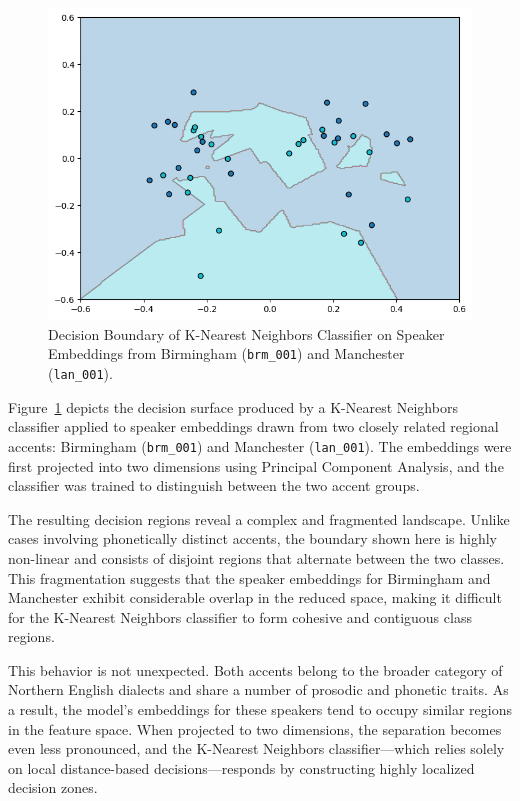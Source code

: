 \documentclass[conference]{IEEEtran}
\begin{document}
\begin{figure}[h]
	\centering
	\includegraphics[width=0.7\linewidth]{img/img-knn-brm-lan.png}
	\caption{Decision Boundary of K-Nearest Neighbors Classifier on Speaker Embeddings from Birmingham (\texttt{brm\_001}) and Manchester (\texttt{lan\_001}).}
	\label{fig:knn-brm-lan}
\end{figure}


Figure~\ref{fig:knn-brm-lan} depicts the decision surface produced by a K-Nearest Neighbors classifier applied to speaker embeddings drawn from two closely related regional accents: Birmingham (\texttt{brm\_001}) and Manchester (\texttt{lan\_001}). The embeddings were first projected into two dimensions using Principal Component Analysis, and the classifier was trained to distinguish between the two accent groups.

The resulting decision regions reveal a complex and fragmented landscape. Unlike cases involving phonetically distinct accents, the boundary shown here is highly non-linear and consists of disjoint regions that alternate between the two classes. This fragmentation suggests that the speaker embeddings for Birmingham and Manchester exhibit considerable overlap in the reduced space, making it difficult for the K-Nearest Neighbors classifier to form cohesive and contiguous class regions.

This behavior is not unexpected. Both accents belong to the broader category of Northern English dialects and share a number of prosodic and phonetic traits. As a result, the model’s embeddings for these speakers tend to occupy similar regions in the feature space. When projected to two dimensions, the separation becomes even less pronounced, and the K-Nearest Neighbors classifier—which relies solely on local distance-based decisions—responds by constructing highly localized decision zones.
\end{document}
